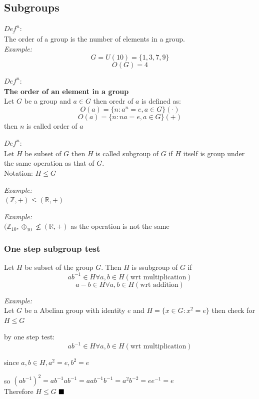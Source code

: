 \documentclass[11pt,letterpaper]{article}
\newenvironment{example}                             
        {\noindent\textit{Example:}\\}
	{}
\newenvironment{definition}
	{\begin{mdframed}$\underline{\textit{Def}^\textit{n}:} $\\}
	{\end{mdframed}}
\begin{document}
\subsection{Subgroups}
\begin{definition}
  The order of a group is the number of elements in a group.\\
  \begin{example}
    \[
      G = U(10) = \{1,3,7,9\}
    \]
    \[
      O(G) = 4
    \]
  \end{example}
\end{definition}

\begin{definition}
  \textbf{The order of an element in a group}\\
  Let $G$ be a group and $a \in G$ then oredr of $a$ is defined as:
  \[
    O(a) = \{n: a^n = e, a\in G\} (\cdot)
  \]
  \[
    O(a) = \{n: na = e, a\in G\} (+)
  \]
  then $n$ is called order of $a$
\end{definition}

\begin{definition}
  Let $H$ be subset of $G$ then $H$ is called subgroup of $G$ if $H$ itself is group under the same operation as that of $G$. \\
  Notation: $H \leq G$
\end{definition}

\begin{example}
  $(\mathbb{Z}, +) \leq (\mathbb{R}, +)$ 
\end{example}

\begin{example}
  $(\mathbb{Z}_{10}, \oplus_{10} \not\leq (\mathbb{R}, +)$ as the operation is not the same
\end{example}

\subsubsection{One step subgroup test}
Let $H$ be subset of the group $G$. Then $H$ is ssubgroup of $G$ if 
\[
  ab^{-1} \in H \forall a,b \in H (\text{wrt multiplication})
\]
\[
  a-b \in H \forall a,b \in H (\text{wrt addition})
\]

\begin{example}
  Let $G$ be a Abelian group with identity $e$ and $H = \{x \in G: x^2 = e\}$ then check for $H \leq G$

  by one step test: 
  \[
    ab^{-1} \in H \forall a,b \in H (\text{wrt multiplication})
  \]

  since $a,b \in H, a^2 = e, b^2 = e$

  so $(ab^{-1})^2 = ab^{-1}ab^{-1} = aab^{-1}b^{-1} = a^2 b^{-2} = e e^{-1} = e$\\
  Therefore $H \leq G$
  $\hfill \blacksquare$
\end{example}
\end{document}
